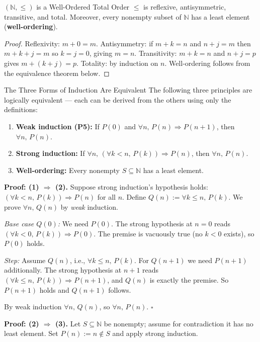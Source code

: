 \documentclass[12pt, openany]{book}
\theoremstyle{plain}
\theoremstyle{definition}
\theoremstyle{remark}
\newcommand{\N}{\mathbb{N}}
\begin{document}
\begin{thmbox}{$(\N, \leq)$ is a Well-Ordered Total Order}
$\leq$ is reflexive, antisymmetric, transitive, and total. Moreover, every nonempty subset of $\N$ has a least element (\textbf{well-ordering}).
\end{thmbox}
\color{black}

\begin{proof}
Reflexivity: $m + 0 = m$. Antisymmetry: if $m + k = n$ and $n + j = m$ then $m + k + j = m$ so $k = j = 0$, giving $m = n$. Transitivity: $m + k = n$ and $n + j = p$ gives $m + (k+j) = p$. Totality: by induction on $n$. Well-ordering follows from the equivalence theorem below.
\end{proof}

\begin{thmbox}{The Three Forms of Induction Are Equivalent}
The following three principles are logically equivalent --- each can be derived from the others using only the definitions:
\begin{enumerate}[noitemsep]
  \item \textbf{Weak induction (P5):} If $P(0)$ and $\forall n,\, P(n) \Rightarrow P(n{+}1)$, then $\forall n,\, P(n)$.
  \item \textbf{Strong induction:} If $\forall n,\, (\forall k < n,\, P(k)) \Rightarrow P(n)$, then $\forall n,\, P(n)$.
  \item \textbf{Well-ordering:} Every nonempty $S \subseteq \N$ has a least element.
\end{enumerate}

\bigskip
\textbf{Proof: (1) $\Rightarrow$ (2).}\quad
Suppose strong induction's hypothesis holds: $(\forall k < n,\, P(k)) \Rightarrow P(n)$ for all $n$.
Define $Q(n) := \forall k \leq n,\, P(k)$.  We prove $\forall n,\, Q(n)$ by \emph{weak} induction.

\textit{Base case $Q(0)$:} We need $P(0)$.  The strong hypothesis at $n = 0$ reads $(\forall k < 0,\, P(k)) \Rightarrow P(0)$.  The premise is vacuously true (no $k < 0$ exists), so $P(0)$ holds.

\textit{Step:} Assume $Q(n)$, i.e., $\forall k \leq n,\, P(k)$.  For $Q(n{+}1)$ we need $P(n{+}1)$ additionally.  The strong hypothesis at $n{+}1$ reads $(\forall k \leq n,\, P(k)) \Rightarrow P(n{+}1)$, and $Q(n)$ is exactly the premise.  So $P(n{+}1)$ holds and $Q(n{+}1)$ follows.

By weak induction $\forall n,\, Q(n)$, so $\forall n,\, P(n)$. \qquad$\square$

\bigskip
\textbf{Proof: (2) $\Rightarrow$ (3).}\quad
Let $S \subseteq \N$ be nonempty; assume for contradiction it has no least element.
Set $P(n) := n \notin S$ and apply strong induction.


\end{thmbox}
\end{document}
